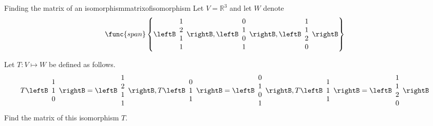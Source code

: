 \begin{example}{Finding the matrix of an isomorphism}{matrixofisomorphism}
Let $V=\mathbb{R}^{3}$ and let $W$ denote 
\begin{equation*}
\func{span}\left\{ \leftB 
\begin{array}{c}
1 \\ 
2 \\ 
1 \\ 
1
\end{array}
\rightB ,\leftB 
\begin{array}{c}
0 \\ 
1 \\ 
0 \\ 
1
\end{array}
\rightB ,\leftB 
\begin{array}{c}
1 \\ 
1 \\ 
2 \\ 
0
\end{array}
\rightB \right\}
\end{equation*}

Let $T: V \mapsto W$ be defined as follows. 
\begin{equation*}
T\leftB 
\begin{array}{c}
1 \\ 
1 \\ 
0
\end{array}
\rightB =\leftB 
\begin{array}{c}
1 \\ 
2 \\ 
1 \\ 
1
\end{array}
\rightB ,T\leftB 
\begin{array}{c}
0 \\ 
1 \\ 
1
\end{array}
\rightB =\leftB 
\begin{array}{c}
0 \\ 
1 \\ 
0 \\ 
1
\end{array}
\rightB ,T\leftB 
\begin{array}{c}
1 \\ 
1 \\ 
1
\end{array}
\rightB =\leftB 
\begin{array}{c}
1 \\ 
1 \\ 
2 \\ 
0
\end{array}
\rightB
\end{equation*}
Find the matrix of this isomorphism $T$.
\end{example}

